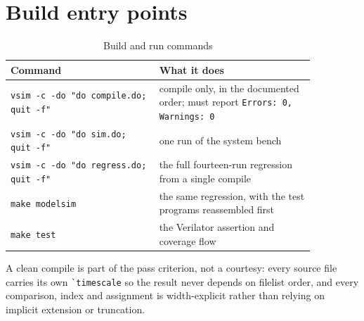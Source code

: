 \section{Build entry points}

\begin{table}[H]
\centering
\caption{Build and run commands}
\label{tab:buildcmds}
\begin{tabular}{@{}L{0.42\linewidth}L{0.44\linewidth}@{}}
\toprule
\textbf{Command} & \textbf{What it does} \\
\midrule
\texttt{vsim -c -do "do compile.do; quit -f"} & compile only, in the documented
  order; must report \texttt{Errors: 0, Warnings: 0} \\
\texttt{vsim -c -do "do sim.do; quit -f"} & one run of the system bench \\
\texttt{vsim -c -do "do regress.do; quit -f"} & the full fourteen-run
  regression from a single compile \\
\texttt{make modelsim} & the same regression, with the test programs
  reassembled first \\
\texttt{make test} & the Verilator assertion and coverage flow \\
\bottomrule
\end{tabular}
\end{table}

A clean compile is part of the pass criterion, not a courtesy: every source file
carries its own \verb|`timescale| so the result never depends on filelist order,
and every comparison, index and assignment is width-explicit rather than relying
on implicit extension or truncation.
